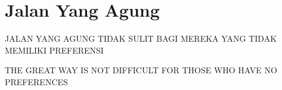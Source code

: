 \chapter{Jalan Yang Agung}

\bahasa
JALAN YANG AGUNG TIDAK SULIT BAGI MEREKA YANG TIDAK MEMILIKI PREFERENSI

\english
THE GREAT WAY IS NOT DIFFICULT FOR THOSE WHO HAVE NO PREFERENCES


